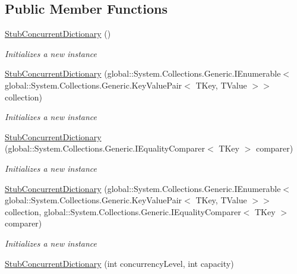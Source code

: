 \subsection*{Public Member Functions}
\begin{DoxyCompactItemize}
\item 
\hyperlink{class_system_1_1_collections_1_1_concurrent_1_1_fakes_1_1_stub_concurrent_dictionary_3_01_t_key_00_01_t_value_01_4_a13e8af5e34dd357bfa2d67df70b0fc5c}{Stub\-Concurrent\-Dictionary} ()
\begin{DoxyCompactList}\small\item\em Initializes a new instance\end{DoxyCompactList}\item 
\hyperlink{class_system_1_1_collections_1_1_concurrent_1_1_fakes_1_1_stub_concurrent_dictionary_3_01_t_key_00_01_t_value_01_4_a24930c74e949408efaf78c80ab47fd84}{Stub\-Concurrent\-Dictionary} (global\-::\-System.\-Collections.\-Generic.\-I\-Enumerable$<$ global\-::\-System.\-Collections.\-Generic.\-Key\-Value\-Pair$<$ T\-Key, T\-Value $>$$>$ collection)
\begin{DoxyCompactList}\small\item\em Initializes a new instance\end{DoxyCompactList}\item 
\hyperlink{class_system_1_1_collections_1_1_concurrent_1_1_fakes_1_1_stub_concurrent_dictionary_3_01_t_key_00_01_t_value_01_4_a21442c9b8856e7b25252b3b827de20e7}{Stub\-Concurrent\-Dictionary} (global\-::\-System.\-Collections.\-Generic.\-I\-Equality\-Comparer$<$ T\-Key $>$ comparer)
\begin{DoxyCompactList}\small\item\em Initializes a new instance\end{DoxyCompactList}\item 
\hyperlink{class_system_1_1_collections_1_1_concurrent_1_1_fakes_1_1_stub_concurrent_dictionary_3_01_t_key_00_01_t_value_01_4_a4b0b359b8ee85716267e231bc306de69}{Stub\-Concurrent\-Dictionary} (global\-::\-System.\-Collections.\-Generic.\-I\-Enumerable$<$ global\-::\-System.\-Collections.\-Generic.\-Key\-Value\-Pair$<$ T\-Key, T\-Value $>$$>$ collection, global\-::\-System.\-Collections.\-Generic.\-I\-Equality\-Comparer$<$ T\-Key $>$ comparer)
\begin{DoxyCompactList}\small\item\em Initializes a new instance\end{DoxyCompactList}\item 
\hyperlink{class_system_1_1_collections_1_1_concurrent_1_1_fakes_1_1_stub_concurrent_dictionary_3_01_t_key_00_01_t_value_01_4_abf705bff80dec8e2abb2324bdc542399}{Stub\-Concurrent\-Dictionary} (int concurrency\-Level, int capacity)

\end{DoxyCompactItemize}
